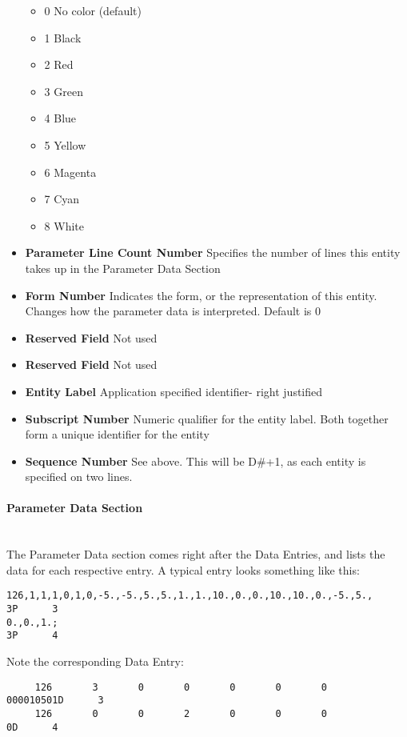 \begin{itemize}
  \begin{itemize}
  \itemsep1pt\parskip0pt
  \item
    0 No color (default)
  \item
    1 Black
  \item
    2 Red
  \item
    3 Green
  \item
    4 Blue
  \item
    5 Yellow
  \item
    6 Magenta
  \item
    7 Cyan
  \item
    8 White
  \end{itemize}
\item
  \textbf{Parameter Line Count Number} Specifies the number of lines
  this entity takes up in the Parameter Data Section
\item
  \textbf{Form Number} Indicates the form, or the representation of this
  entity. Changes how the parameter data is interpreted. Default is 0
\item
  \textbf{Reserved Field} Not used
\item
  \textbf{Reserved Field} Not used
\item
  \textbf{Entity Label} Application specified identifier- right
  justified
\item
  \textbf{Subscript Number} Numeric qualifier for the entity label. Both
  together form a unique identifier for the entity
\item
  \textbf{Sequence Number} See above. This will be D\#+1, as each entity
  is specified on two lines.
\end{itemize}

\paragraph{Parameter Data Section}\label{parameter-data-section}\\
The Parameter Data section comes right after the Data Entries, and lists
the data for each respective entry. A typical entry looks something like
this:
\begin{Verbatim}
126,1,1,1,0,1,0,-5.,-5.,5.,5.,1.,1.,10.,0.,0.,10.,10.,0.,-5.,5.,       3P      3
0.,0.,1.;                                                              3P      4
\end{Verbatim}

Note the corresponding Data Entry:

\begin{Verbatim}
     126       3       0       0       0       0       0       000010501D      3
     126       0       0       2       0       0       0               0D      4
\end{Verbatim}

